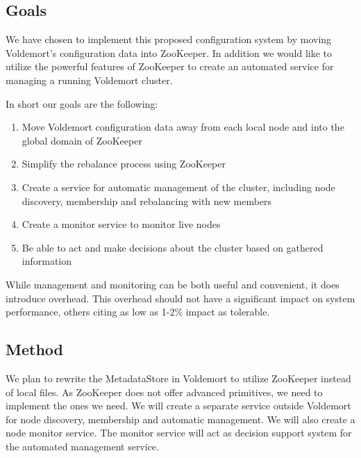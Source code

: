 \subsection{Goals}
We have chosen to implement this proposed configuration system by moving Voldemort's configuration data into ZooKeeper. In addition we would like to utilize the powerful features of ZooKeeper to create an automated service for managing a running Voldemort cluster. 


In short our goals are the following:

\begin{enumerate}
	\item{Move Voldemort configuration data away from each local node and into the global domain of ZooKeeper}
	\item{Simplify the rebalance process using ZooKeeper}
	\item{Create a service for automatic management of the cluster, including node discovery, membership and rebalancing with new members}
	\item{Create a monitor service to monitor live nodes}
	\item{Be able to act and make decisions about the cluster based on gathered information}
\end{enumerate}

While management and monitoring can be both useful and convenient, it does introduce overhead. This overhead should not have a significant impact on system performance, others citing as low as 1-2\% impact as tolerable.

\subsection{Method}
We plan to rewrite the MetadataStore in Voldemort to utilize ZooKeeper instead of local files. As ZooKeeper does not offer advanced primitives, we need to implement the ones we need. We will create a separate service outside Voldemort for node discovery, membership and automatic management. We will also create a node monitor service. The monitor service will act as decision support system for the automated management service. 



